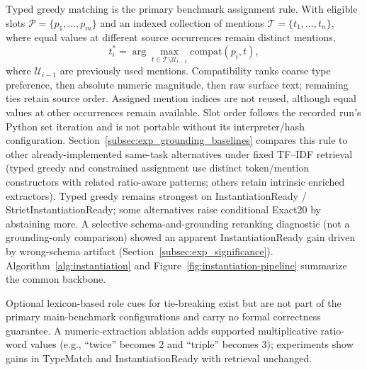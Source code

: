 \documentclass[pdflatex,sn-basic,Numbered]{sn-jnl}
\begin{document}
Typed greedy matching is the primary benchmark assignment rule. With eligible slots $\mathcal{P}=\{p_1,\dots,p_m\}$ and an indexed collection of mentions $\mathcal{T}=\{t_1,\dots,t_n\}$, where equal values at different source occurrences remain distinct mentions,
\begin{equation}
t_i^{*} = \arg\max_{t \in \mathcal{T}\setminus \mathcal{U}_{i-1}} \mathrm{compat}(p_i,t),
\label{eq:typed_assignment}
\end{equation}
where $\mathcal{U}_{i-1}$ are previously used mentions. Compatibility ranks coarse type preference, then absolute numeric magnitude, then raw surface text; remaining ties retain source order. Assigned mention indices are not reused, although equal values at other occurrences remain available. Slot order follows the recorded run's Python set iteration and is not portable without its interpreter/hash configuration. Section~\ref{subsec:exp_grounding_baselines} compares this rule to other already-implemented same-task alternatives under fixed TF--IDF retrieval (typed greedy and constrained assignment use distinct token/mention constructors with related ratio-aware patterns; others retain intrinsic enriched extractors). Typed greedy remains strongest on InstantiationReady / StrictInstantiationReady; some alternatives raise conditional Exact20 by abstaining more. A selective schema-and-grounding reranking diagnostic (not a grounding-only comparison) showed an apparent InstantiationReady gain driven by wrong-schema artifact (Section~\ref{subsec:exp_significance}). Algorithm~\ref{alg:instantiation} and Figure~\ref{fig:instantiation-pipeline} summarize the common backbone.

Optional lexicon-based role cues for tie-breaking exist but are not part of the primary main-benchmark configurations and carry no formal correctness guarantee. A numeric-extraction ablation adds supported multiplicative ratio-word values (e.g., ``twice'' becomes 2 and ``triple'' becomes 3); experiments show gains in TypeMatch and InstantiationReady with retrieval unchanged.
\end{document}
